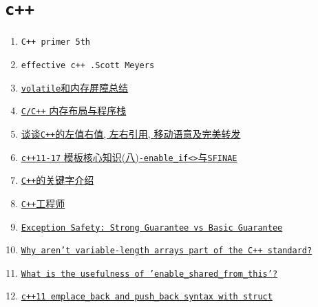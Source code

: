 \section{\tt c++}
\begin{enumerate}
	\item {\tt C++ primer 5th}
	\item {\tt effective c++ .Scott Meyers}
	\item \href{https://zhuanlan.zhihu.com/p/43526907}{{\tt volatile}和内存屏障总结}
	\item \href{https://zhuanlan.zhihu.com/p/184957568}{{\tt C/C++} 内存布局与程序栈}
	\item \href{https://zhuanlan.zhihu.com/p/402251966}{谈谈{\tt C++}的左值右值, 左右引用, 移动语意及完美转发}
	\item \href{https://zhuanlan.zhihu.com/p/338822185}{{\tt c++11-17} 模板核心知识(八){\tt -enable\_if<>}与{\tt SFINAE}}
	\item \href{https://zhuanlan.zhihu.com/p/467001575}{{\tt C++}的关键字介绍}
	\item \href{https://www.nowcoder.com/issue/tutorial?tutorialId=93&uuid=a34ed23d58b84da3a707c70371f59c21}{{\tt C++}工程师}
	\item \href{https://stackoverflow.com/questions/65271783/exception-safety-strong-guarantee-vs-basic-guarantee?r=SearchResults}{\tt Exception Safety: Strong Guarantee vs Basic Guarantee}
	\item \href{https://stackoverflow.com/questions/1887097/why-arent-variable-length-arrays-part-of-the-c-standard}{\tt Why aren't variable-length arrays part of the C++ standard?}
	\item \href{https://stackoverflow.com/questions/712279/what-is-the-usefulness-of-enable-shared-from-this?r=SearchResults}{\tt What is the usefulness of 'enable\_shared\_from\_this'?}
	\item \href{https://stackoverflow.com/questions/20603335/c11-emplace-back-and-push-back-syntax-with-struct}{\tt c++11 emplace\_back and push\_back syntax with struct}
\end{enumerate}


